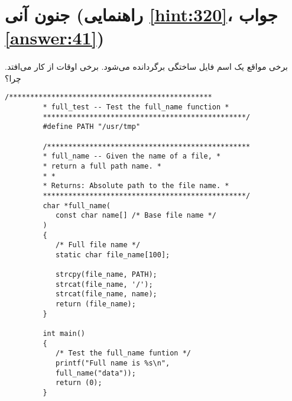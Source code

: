 \section[جنون آنی]{جنون آنی \protect{} (راهنمایی \ref{hint:320}، جواب \ref{answer:41})}
\paragraph{}\label{prog:65}
برخی مواقع یک اسم فایل ساختگی برگردانده می‌شود. برخی اوقات از کار می‌افتد. چرا؟

\begin{LTR}
    \begin{lstlisting}[style=C++Style]
         /************************************************
         * full_test -- Test the full_name function *
         ************************************************/
         #define PATH "/usr/tmp"

         /************************************************
         * full_name -- Given the name of a file, *
         * return a full path name. *
         * *
         * Returns: Absolute path to the file name. *
         ************************************************/
         char *full_name(
         	const char name[] /* Base file name */
         )
         {
         	/* Full file name */
         	static char file_name[100];

         	strcpy(file_name, PATH);
         	strcat(file_name, '/');
         	strcat(file_name, name);
         	return (file_name);
         }

         int main()
         {
         	/* Test the full_name funtion */
         	printf("Full name is %s\n",
         	full_name("data"));
         	return (0);
         }
    \end{lstlisting}
\end{LTR}